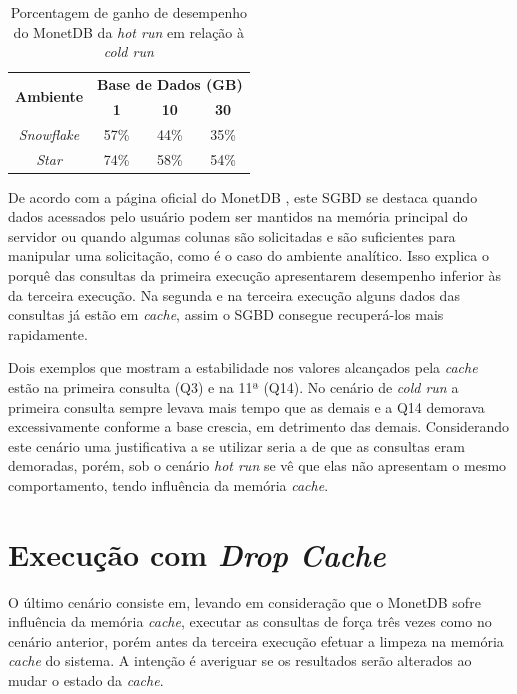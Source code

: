 \begin{table}[htpb]
        \centering
        \caption{Porcentagem de ganho de desempenho do MonetDB da \textit{hot run} em relação à \textit{cold run}}
        \label{tab:ganho_monet_cold_hot}
        \begin{tabular}{|c|c|c|c|}
        \hline
        \multirow{2}{*}{\textbf{Ambiente}} & \multicolumn{3}{c|}{\textbf{Base de Dados (GB)}} \\ \cline{2-4} 
        & \textbf{1}     & \textbf{10}    & \textbf{30}    \\ \hline
        \textit{Snowflake}                 & 57\%           & 44\%           & 35\%           \\ \hline
        \textit{Star}                      & 74\%           & 58\%           & 54\%           \\ \hline
        \end{tabular}
\end{table}

De acordo com a página oficial do MonetDB \cite{monetdb2017c}, este SGBD se destaca quando dados acessados pelo usuário podem ser mantidos na memória principal do servidor ou quando algumas colunas são solicitadas e são suficientes para manipular uma solicitação, como é o caso do ambiente analítico. Isso explica o porquê das consultas da primeira execução apresentarem desempenho inferior às da terceira execução. Na segunda e na terceira execução alguns dados das consultas já estão em \textit{cache}, assim o SGBD consegue recuperá-los mais rapidamente.

Dois exemplos que mostram a estabilidade nos valores alcançados pela \textit{cache} estão na primeira consulta (Q3) e na 11ª (Q14). No cenário de \textit{cold run} a primeira consulta sempre levava mais tempo que as demais e a Q14 demorava excessivamente conforme a base crescia, em detrimento das demais. Considerando este cenário uma justificativa a se utilizar seria a de que as consultas eram demoradas, porém, sob o cenário \textit{hot run} se vê que elas não apresentam o mesmo comportamento, tendo influência da memória \textit{cache}.

\section{Execução com \textit{Drop Cache}}

O último cenário consiste em, levando em consideração que o MonetDB sofre influência da memória \textit{cache}, executar as consultas de força três vezes como no cenário anterior, porém antes da terceira execução efetuar a limpeza na memória \textit{cache} do sistema. A intenção é averiguar se os resultados serão alterados ao mudar o estado da \textit{cache}.

